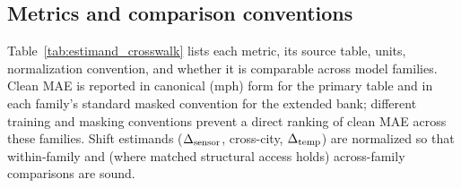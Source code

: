 \subsection{Metrics and comparison conventions}
\label{sec:appendix_estimand_crosswalk}


Table~\ref{tab:estimand_crosswalk} lists each metric, its source table, units, normalization convention, and whether it is comparable across
model families. Clean MAE is reported in canonical (mph) form for the primary
table and in each family's standard masked convention for the extended bank;
different training and masking conventions prevent a direct ranking of clean MAE across these families. Shift estimands ($\Delta_{\text{sensor}}$, cross-city,
$\Delta_{\text{temp}}$) are normalized so that within-family and (where matched
structural access holds) across-family comparisons are sound.

\begin{table}[h]
\centering
\caption{Metrics and comparison conventions: which numbers are cross-family-comparable.}
\label{tab:estimand_crosswalk}
\vskip 0.05in
\small
{}
\end{table}

